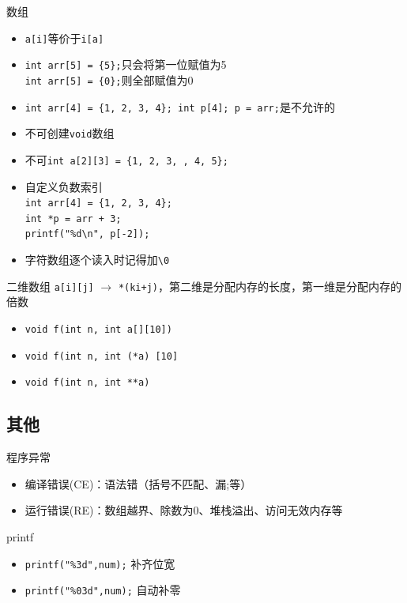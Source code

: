 \documentclass[UTF8]{ctexbeamer}
\begin{document}
\begin{frame}[fragile]{数组}
\begin{itemize}[<+->]
	\item \verb'a[i]'等价于\verb'i[a]'
	\item \verb'int arr[5] = {5};'只会将第一位赋值为5\\
		\verb'int arr[5] = {0};'则全部赋值为0
	\item \verb'int arr[4] = {1, 2, 3, 4}; int p[4]; p = arr;'是不允许的
	\item 不可创建\verb'void'数组
	\item 不可\verb'int a[2][3] = {1, 2, 3, , 4, 5};'
	\item 自定义负数索引\\
		\verb'int arr[4] = {1, 2, 3, 4};'\\
		\verb'int *p = arr + 3;'\\
		\verb'printf("%d\n", p[-2]);'
	\item 字符数组逐个读入时记得加\verb'\0'
\end{itemize}
\end{frame}

\begin{frame}[fragile]{二维数组}
\verb'a[i][j]' $\to$ \verb'*(ki+j)'，第二维是分配内存的长度，第一维是分配内存的倍数
\begin{itemize}
	\item \verb'void f(int n, int a[][10])'
	\item \verb'void f(int n, int (*a) [10]'
	\item \verb'void f(int n, int **a)'
\end{itemize}
\end{frame}

\subsection{其他}
\begin{frame}
\subsectionpage
\end{frame}

\begin{frame}{程序异常}
\begin{itemize}
	\item 编译错误(CE)：语法错（括号不匹配、漏;等）
	\item 运行错误(RE)：数组越界、除数为0、堆栈溢出、访问无效内存等
\end{itemize}
\end{frame}

\begin{frame}[fragile]{printf}
\begin{itemize}
	\item \verb'printf("%3d",num);' 补齐位宽
	\item \verb'printf("%03d",num);' 自动补零
\end{itemize}
\end{frame}
\end{document}
